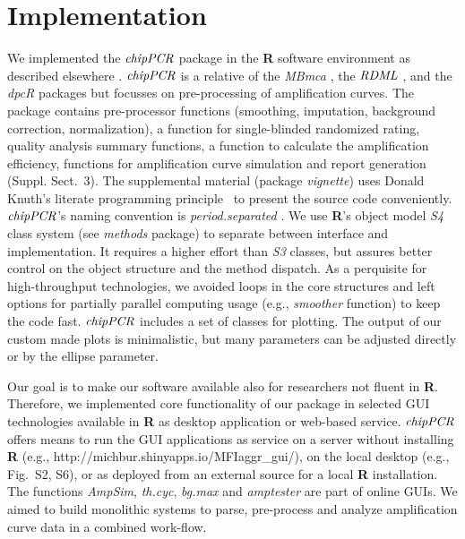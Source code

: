 \documentclass{bioinfo}
\begin{document}
\section{Implementation}
\begin{methods}

We implemented the $\emph{chipPCR}$ package in the \textbf{R} software environment 
as described elsewhere \citep{RCT_2013,rodiger_rkward_2012}. $\emph{chipPCR}$ is 
a relative of the \emph{MBmca} \citep{roediger_RJ_2013}, the $\emph{RDML}$  
\citep{blagodatskikh_2014}, and the \emph{dpcR} \citep{pabinger_2014} packages 
but focusses on pre-processing of amplification curves. The package contains 
pre-processor functions (smoothing, imputation, background correction, 
normalization), a function for single-blinded randomized rating, quality 
analysis summary functions, a function to calculate the amplification 
efficiency, functions for amplification curve simulation and report 
generation (Suppl. Sect.~3). The supplemental material %
(package \textit{vignette}) uses Donald Knuth's literate programming 
principle~\citep{Knuth1984} to present the source code conveniently. 
$\emph{chipPCR}$'s naming convention is \textit{period.separated} 
\citep{Baaaath_2012}. We use \textbf{R}'s object model \emph{S4} class system 
(see \emph{methods} package) to separate between interface and implementation. 
It requires a higher effort than \emph{S3} classes, but assures better control 
on the object structure and the method dispatch. As a perquisite for 
high-throughput technologies, we avoided loops in the core structures and left 
options for partially parallel computing usage (e.g., \textsl{smoother} function) to 
keep the code fast. $\emph{chipPCR}$ includes a set of classes for plotting. The 
output of our custom made plots is minimalistic, but many parameters can be 
adjusted directly or by the ellipse parameter.

Our goal is to make our software available also for researchers not fluent in 
\textbf{R}. Therefore, we implemented core functionality of our package in 
selected GUI technologies available in \textbf{R} \citep{rodiger_rkward_2012} as 
desktop application or web-based service. $\emph{chipPCR}$ offers means to run 
the GUI applications as service on a server without installing \textbf{R} (e.g., 
http://michbur.shinyapps.io/MFIaggr\_gui/), on the local 
desktop (e.g., Fig.~S2, S6), or as deployed from an external %
source for a local \textbf{R} installation. The functions \textsl{AmpSim}, 
\textsl{th.cyc}, \textsl{bg.max} and \textsl{amptester} are part of online GUIs. 
We aimed to build monolithic systems to parse, pre-process and analyze 
amplification curve data in a combined work-flow. 


\end{methods}
\end{document}
